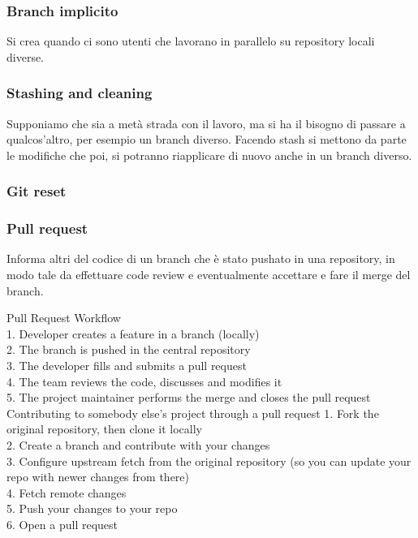 \documentclass[10pt,a4paper]{book}
\begin{document}
\subsubsection{Branch implicito}
Si crea quando ci sono utenti che lavorano  in parallelo su repository locali diverse.

\subsubsection{Stashing and cleaning}
Supponiamo che sia a metà strada con il lavoro, ma si ha il bisogno di passare a qualcos'altro, per esempio un branch diverso.
Facendo stash si mettono da parte le modifiche che poi, si potranno riapplicare di nuovo anche in un branch diverso.

\subsubsection{Git reset}%


\subsubsection{Pull request}
Informa altri del codice di un branch che è stato pushato in una repository, in modo tale da effettuare code review e eventualmente accettare e fare il merge del branch.

Pull Request Workflow\\
1. Developer creates a feature in a branch (locally)\\
2. The branch is pushed in the central repository\\
3. The developer fills and submits a pull request\\
4. The team reviews the code, discusses and modifies it\\
5. The project maintainer performs the merge and closes the pull request\\

Contributing to somebody else's project through a pull request
1. Fork the original repository, then clone it locally\\
2. Create a branch and contribute with your changes\\
3. Configure upstream fetch from the original repository (so you can update your repo with newer changes from there)\\
4. Fetch remote changes\\
5. Push your changes to your repo\\
6. Open a pull request\\
\end{document}
